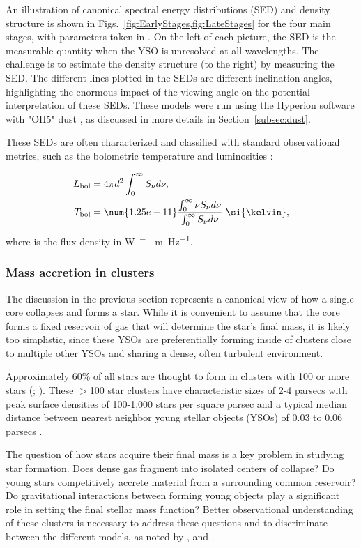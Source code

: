 An illustration of canonical spectral energy distributions (SED) and density structure is shown in Figs.~\ref{fig:EarlyStages,fig:LateStages} for the four main stages, with parameters taken in \cite{Whitney:2003kc}. On the left of each picture, the SED is the measurable quantity when the YSO is unresolved at all wavelengths. The challenge is to estimate the density structure (to the right) by measuring the SED. The different lines plotted in the SEDs are different inclination angles, highlighting the enormous impact of the viewing angle on the potential interpretation of these SEDs. These models were run using the Hyperion software \citep{Robitaille:2011fc} with "OH5" dust \citep{Ossenkopf:1994tq}, as discussed in more details in Section~\ref{subsec:dust}.

These SEDs are often characterized and classified with standard observational metrics, such as the bolometric temperature and luminosities \citep{Myers:1993en,Dunham:2010bx}:

\begin{align}
\Lbol &= 4\pi d^2\int_0^\infty\Snu d\nu,\\
\Tbol &= \num{1.25e-11} \frac{\int_0^\infty \nu\Snu d\nu}{\int_0^\infty \Snu d\nu}~\si{\kelvin},
\end{align}
%
where \Snu is the flux density in \si{\watt\per{}\meter\per\hertz}. 

\subsubsection{Mass accretion in clusters}


The discussion in the previous section represents a canonical view of how a single core collapses and forms a star. While it is convenient to assume that the core forms a fixed reservoir of gas that will determine the star's final mass, it is likely too simplistic, since these YSOs are preferentially forming inside of clusters close to multiple other YSOs and sharing a dense, often turbulent environment. 

Approximately 60\% of all stars are thought to form in clusters with 100 or more stars (\cite{Porras:2003p1395}; \cite{Allen:2007p1439}). These $>$100 star clusters have characteristic sizes of 2-4 parsecs with peak surface densities of 100-1,000 stars per square parsec and a typical median distance between nearest neighbor young stellar objects (YSOs) of 0.03 to 0.06 parsecs \citep{Gutermuth:2009p1325}.

The question of how stars acquire their final mass is a key problem in studying star formation. Does dense gas fragment into isolated centers of collapse? Do young stars competitively accrete material from a surrounding common reservoir? Do gravitational interactions between forming young objects play a significant role in setting the final stellar mass function? Better observational understanding of these clusters is necessary to address these questions and to discriminate between the different models, as noted by \cite{Bonnell:2006ee}, \cite{Offner:2011ex} and \cite{Myers:2011fy}.

